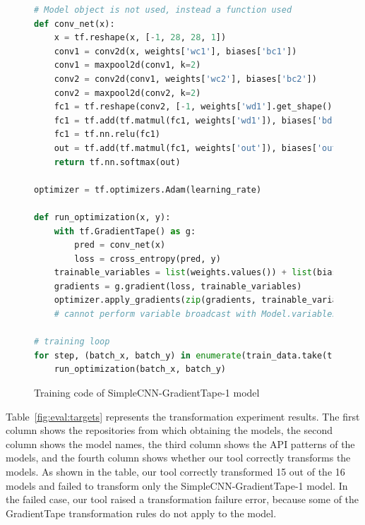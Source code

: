 \begin{figure}[!ht]
  \begin{lstlisting}[language=Python]
# Model object is not used, instead a function used
def conv_net(x):
    x = tf.reshape(x, [-1, 28, 28, 1])
    conv1 = conv2d(x, weights['wc1'], biases['bc1'])
    conv1 = maxpool2d(conv1, k=2)
    conv2 = conv2d(conv1, weights['wc2'], biases['bc2'])
    conv2 = maxpool2d(conv2, k=2)
    fc1 = tf.reshape(conv2, [-1, weights['wd1'].get_shape().as_list()[0]])
    fc1 = tf.add(tf.matmul(fc1, weights['wd1']), biases['bd1'])
    fc1 = tf.nn.relu(fc1)
    out = tf.add(tf.matmul(fc1, weights['out']), biases['out'])
    return tf.nn.softmax(out)

optimizer = tf.optimizers.Adam(learning_rate)

def run_optimization(x, y):
    with tf.GradientTape() as g:
        pred = conv_net(x)
        loss = cross_entropy(pred, y) 
    trainable_variables = list(weights.values()) + list(biases.values())
    gradients = g.gradient(loss, trainable_variables)
    optimizer.apply_gradients(zip(gradients, trainable_variables))
    # cannot perform variable broadcast with Model.variables

# training loop
for step, (batch_x, batch_y) in enumerate(train_data.take(training_steps), 1):
    run_optimization(batch_x, batch_y)\end{lstlisting}
  \caption{Training code of SimpleCNN-GradientTape-1 model}
  \label{fig:eval:simplecnn1}
\end{figure}


Table~\ref{fig:eval:targets} represents the transformation experiment results.
The first column shows the repositories from which obtaining the models, the
second column shows the model names, the third column shows the API patterns of
the models, and the fourth column shows whether our tool correctly transforms
the models.
As shown in the table, our tool correctly transformed 15 out of the 16 models
and failed to transform only the SimpleCNN-GradientTape-1 model.
In the failed case, our tool raised a transformation failure error, because
some of the GradientTape transformation rules do not apply to the model.



